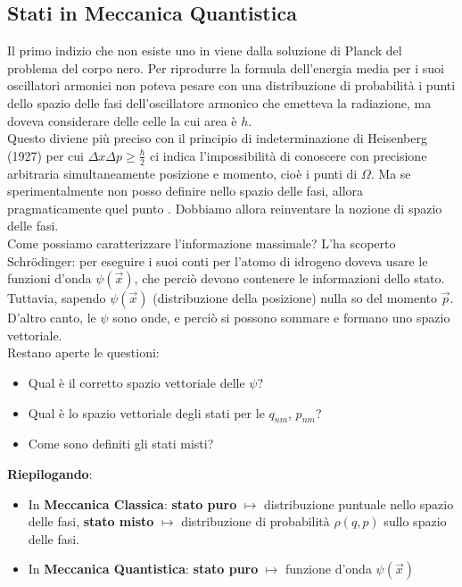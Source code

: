 \documentclass[FisicaTeorica.tex]{subfiles}
\begin{document}
\subsection{Stati in Meccanica Quantistica}
Il primo indizio che non esiste uno  in \MQ viene dalla soluzione di Planck del problema del corpo nero. Per riprodurre la formula dell'energia media per i suoi oscillatori armonici non poteva pesare con una distribuzione di probabilità i punti dello spazio delle fasi dell'oscillatore armonico che emetteva la radiazione, ma doveva considerare delle celle la cui area è $h$.\\ 
Questo diviene più preciso con il principio di indeterminazione di Heisenberg (1927) per cui 
$\Delta x \Delta p\geq \frac{\hbar}{2}$ ci indica l'impossibilità di conoscere con precisione arbitraria simultaneamente posizione e momento, cioè i punti di $\Omega$. Ma se sperimentalmente non posso definire  nello spazio delle fasi, allora pragmaticamente quel punto . Dobbiamo allora reinventare la nozione di spazio delle fasi.\\

Come possiamo caratterizzare l'informazione massimale?
L'ha scoperto Schrödinger: per eseguire i suoi conti per l'atomo di idrogeno doveva usare le funzioni d'onda $\psi(\vec{x})$, che perciò devono contenere le informazioni dello stato.
Tuttavia, sapendo $\psi(\vec{x})$ (distribuzione della posizione) nulla so del momento $\vec{p}$. D'altro canto, le $\psi$ sono onde, e perciò si possono sommare e formano uno spazio vettoriale.\\
Restano aperte le questioni:
\begin{itemize}
    \item Qual è il corretto spazio vettoriale delle $\psi$?
    \item Qual è lo spazio vettoriale degli stati per le $q_{nm}$, $p_{nm}$?
    \item Come sono definiti gli stati misti? 
\end{itemize}

\textbf{Riepilogando}:
\begin{itemize}
    \item In \textbf{Meccanica Classica}: \textbf{stato puro} $\mapsto$ distribuzione  puntuale nello spazio delle fasi, \textbf{stato misto} $\mapsto$ distribuzione di probabilità $\rho(q,p)$ sullo spazio delle fasi.
    \item In \textbf{Meccanica Quantistica}: \textbf{stato puro} $\mapsto$ funzione d'onda $\psi(\vec{x})$
\end{itemize}
\end{document}
